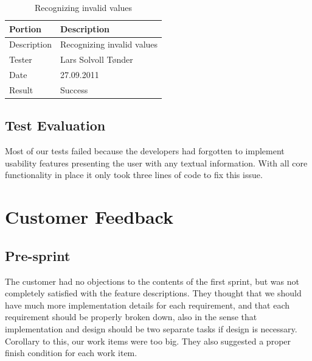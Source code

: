 \begin{table}[!htb] \footnotesize \center
\caption{Supporting configuration files \label{tab:sp1_tid06}}
\noindent{}
\end{table}

\begin{table}[!htb] \footnotesize \center
\caption{Recognizing invalid values \label{tab:sp1_tid07}}
\begin{tabular}{l l}
	\toprule
	Portion & Description \\
	\midrule
	Description &  Recognizing invalid values  \\
	Tester & Lars Solvoll Tønder \\
	Date & 27.09.2011 \\
	Result & Success\\
	\bottomrule
\end{tabular}
\end{table}

\subsection{Test Evaluation}
Most of our tests failed because the developers had forgotten to implement
usability features presenting the user with any textual information. With all
core functionality in place it only took three lines of code to fix this issue.


\section{Customer Feedback}

\subsection{Pre-sprint}
The customer had no objections to the contents of the first sprint, but was not completely satisfied with the feature descriptions. They thought that we should have much more implementation details for each requirement, and that each requirement should be properly broken down, also in the sense that implementation and design should be two separate tasks if design is necessary. Corollary to this, our work items were too big. They also suggested a proper finish condition for each work item.

